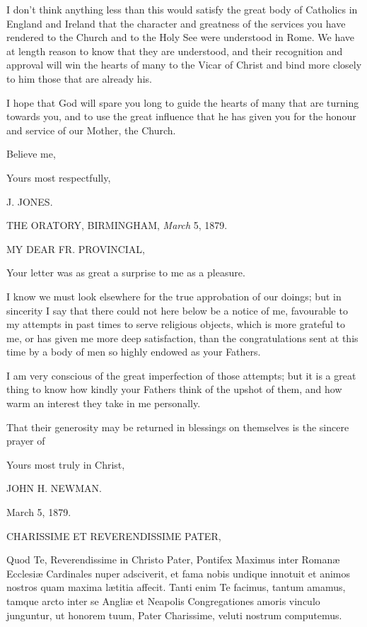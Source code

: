 I don't think anything less than this would satisfy the great body
of Catholics in England and Ireland that the character and greatness
of the services you have rendered to the Church and to the Holy
See were understood in Rome. We have at length reason to know that
they are understood, and their recognition and approval will win the
hearts of many to the Vicar of Christ and bind more closely to him
those that are already his.

I hope that God will spare you long to guide the hearts of many
that are turning towards you, and to use the great influence that he
has given you for the honour and service of our Mother, the Church.

Believe me,

Yours most respectfully,

J. JONES.


THE ORATORY, BIRMINGHAM,
\emph{March} 5, 1879.

MY DEAR FR.
PROVINCIAL,

Your letter was as great a surprise to me as a pleasure.

I know we must look elsewhere for the true approbation of our
doings; but in sincerity I say that there could not here below be a
notice of me, favourable to my attempts in past times to serve
religious objects, which is more grateful to me, or has given me more
deep satisfaction, than the congratulations sent at this time by a
body of men so highly endowed as your Fathers.

I am very conscious of the great imperfection of those attempts;
but it is a great thing to know how kindly your Fathers think of the
upshot of them, and how warm an interest they take in me personally.

That their generosity may be returned in blessings on themselves is
the sincere prayer of

Yours most truly in Christ,

JOHN H. NEWMAN.


March 5, 1879.

CHARISSIME ET REVERENDISSIME
PATER,

Quod Te, Reverendissime in Christo Pater, Pontifex Maximus inter
Romanæ Ecclesiæ Cardinales nuper adsciverit, et fama nobis undique
innotuit et animos nostros quam maxima lætitia affecit. Tanti enim Te
facimus, tantum amamus, tamque arcto inter se Angliæ et Neapolis
Congregationes amoris vinculo junguntur, ut honorem tuum, Pater
Charissime, veluti nostrum computemus.

